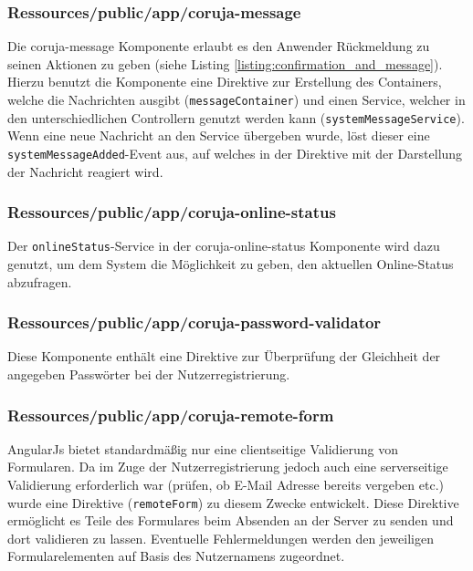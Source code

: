 \subsubsection*{Ressources/public/app/coruja-message}
Die coruja-message Komponente erlaubt es den Anwender Rückmeldung zu seinen Aktionen zu geben (siehe Listing \ref{listing:confirmation_and_message}). Hierzu benutzt die Komponente eine Direktive zur Erstellung des Containers, welche die Nachrichten ausgibt (\texttt{messageContainer}) und einen Service, welcher in den unterschiedlichen Controllern genutzt werden kann (\texttt{system\allowbreak Message\allowbreak Service}). Wenn eine neue Nachricht an den Service übergeben wurde, löst dieser eine \texttt{system\allowbreak Message\allowbreak Added}-Event aus, auf welches in der Direktive mit der Darstellung der Nachricht reagiert wird. 

\subsubsection*{Ressources/public/app/coruja-online-status}
Der \texttt{onlineStatus}-Service in der coruja-online-status Komponente wird dazu genutzt, um dem System die Möglichkeit zu geben, den aktuellen Online-Status abzufragen.

\subsubsection*{Ressources/public/app/coruja-password-validator}
Diese Komponente enthält eine Direktive zur Überprüfung der Gleichheit der angegeben Passwörter bei der Nutzerregistrierung.

\subsubsection*{Ressources/public/app/coruja-remote-form}
AngularJs bietet standardmäßig nur eine clientseitige Validierung von Formularen. Da im Zuge der Nutzerregistrierung jedoch auch eine serverseitige Validierung erforderlich war (prüfen, ob E-Mail Adresse bereits vergeben etc.) wurde eine Direktive (\texttt{remote\allowbreak Form}) zu diesem Zwecke entwickelt. Diese Direktive ermöglicht es Teile des Formulares beim Absenden an der Server zu senden und dort validieren zu lassen. Eventuelle Fehlermeldungen werden den jeweiligen Formularelementen auf Basis des Nutzernamens zugeordnet.


